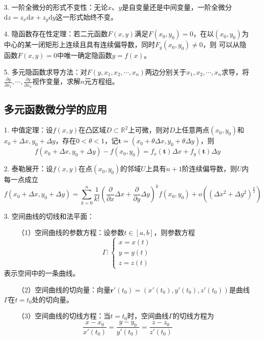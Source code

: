 3. 一阶全微分的形式不变性：无论$x$、$y$是自变量还是中间变量，一阶全微分$\mathrm{d}z=z_x\mathrm{d}x+z_y\mathrm{d}y$这一形式始终不变。

4. 隐函数存在性定理：若二元函数$F(x,y)$满足$F(x_0,y_0)=0$，在以$(x_0,y_0)$为中心的某一闭矩形上连续且具有连续偏导数，同时$F_y(x_0,y_0)\neq 0$，则
可以从隐函数$F(x,y)=0$中唯一确定隐函数$y=f(x)$。

5. 多元隐函数求导方法：对$F(y,x_1,x_2,\cdots,x_n)$两边分别关于$x_1,x_2,\cdots,x_n$求导，将$\frac{\partial y}{\partial x_1},\cdots,\frac{\partial y}{\partial x_n}$视作变量，求解$n$元方程组。

\subsection{多元函数微分学的应用}

1. 中值定理：设$f(x,y)$在凸区域$D\subset \mathbb{R}^2$上可微，则对$D$上任意两点$(x_0,y_0)$和$x_0+\Delta x,y_0+\Delta y$，存在$0<\theta<1$，记$\mathbf{t }= (x_0+\theta \Delta x,y_0+\theta \Delta y)$，则
\begin{equation*}
    f(x_0+\Delta x,y_0+\Delta y)-f(x_0,y_0)=f_x(\mathbf{t})\Delta x+f_y(\mathbf{t})\Delta y
\end{equation*}

2. 泰勒展开：设$f(x,y)$在点$(x_0,y_0)$的邻域$U$上具有$n+1$阶连续偏导数，则$U$内每一点成立
\begin{equation*}
    f(x_0+\Delta x,y_0+\Delta y)=\sum\limits_{k=0}^n \frac{1}{k!}\left(\frac{\partial}{\partial x}\Delta x +\frac{\partial}{\partial y}\Delta y\right)^k f(x_0,y_0)+o\left(\left(\Delta x^2+\Delta y^2\right)^\frac{k}{2}\right)
\end{equation*}

3. 空间曲线的切线和法平面：

~~~~（1）空间曲线的参数方程：设参数$t\in[a,b]$，则参数方程
\begin{equation*}
    \Gamma:\left\{\begin{aligned}
        x=x(t)\\
        y=y(t)\\
        z=z(t)
    \end{aligned}\right.
\end{equation*}
表示空间中的一条曲线。

~~~~（2）空间曲线的切向量：向量$\mathbf{r}'(t_0)=\left(x'(t_0),y'(t_0),z'(t_0)\right)$是曲线$\Gamma$在$t=t_0$处的切向量。

~~~~（3）空间曲线的切线方程：当$t=t_0$时，空间曲线$\Gamma$的切线方程为
\begin{equation*}
    \frac{x-x_0}{x'(t_0)}=\frac{y-y_0}{y'(t_0)}=\frac{z-z_0}{z'(t_0)}
\end{equation*}

